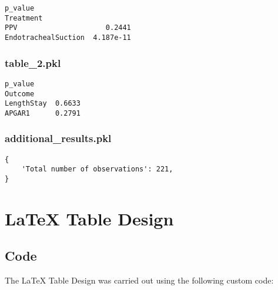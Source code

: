 \documentclass[11pt]{article}
\begin{document}
\begin{Verbatim}[tabsize=4]
                       p_value
Treatment
PPV                     0.2441
EndotrachealSuction  4.187e-11
\end{Verbatim}

\subsubsection*{table\_2.pkl}

\begin{Verbatim}[tabsize=4]
           p_value
Outcome
LengthStay  0.6633
APGAR1      0.2791
\end{Verbatim}

\subsubsection*{additional\_results.pkl}

\begin{Verbatim}[tabsize=4]
{
    'Total number of observations': 221,
}
\end{Verbatim}

\section{LaTeX Table Design} \subsection{Code}The LaTeX Table Design was carried out using the following custom code:
\end{document}
